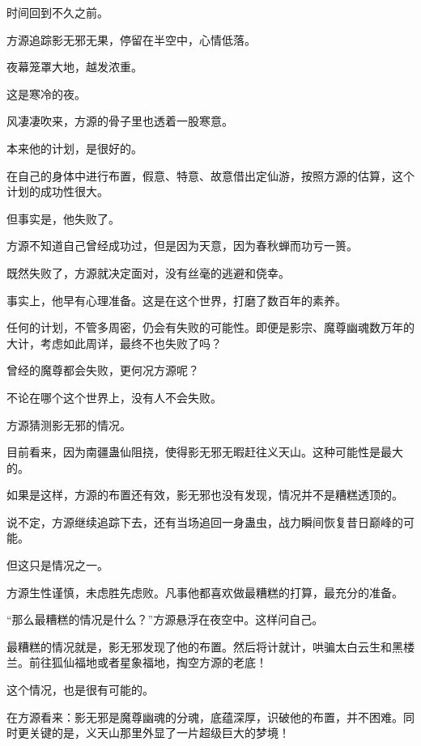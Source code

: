 
\begin{this_body}



时间回到不久之前。

方源追踪影无邪无果，停留在半空中，心情低落。

夜幕笼罩大地，越发浓重。

这是寒冷的夜。

风凄凄吹来，方源的骨子里也透着一股寒意。

本来他的计划，是很好的。

在自己的身体中进行布置，假意、特意、故意借出定仙游，按照方源的估算，这个计划的成功性很大。

但事实是，他失败了。

方源不知道自己曾经成功过，但是因为天意，因为春秋蝉而功亏一篑。

既然失败了，方源就决定面对，没有丝毫的逃避和侥幸。

事实上，他早有心理准备。这是在这个世界，打磨了数百年的素养。

任何的计划，不管多周密，仍会有失败的可能性。即便是影宗、魔尊幽魂数万年的大计，考虑如此周详，最终不也失败了吗？

曾经的魔尊都会失败，更何况方源呢？

不论在哪个这个世界上，没有人不会失败。

方源猜测影无邪的情况。

目前看来，因为南疆蛊仙阻挠，使得影无邪无暇赶往义天山。这种可能性是最大的。

如果是这样，方源的布置还有效，影无邪也没有发现，情况并不是糟糕透顶的。

说不定，方源继续追踪下去，还有当场追回一身蛊虫，战力瞬间恢复昔日巅峰的可能。

但这只是情况之一。

方源生性谨慎，未虑胜先虑败。凡事他都喜欢做最糟糕的打算，最充分的准备。

“那么最糟糕的情况是什么？”方源悬浮在夜空中。这样问自己。

最糟糕的情况就是，影无邪发现了他的布置。然后将计就计，哄骗太白云生和黑楼兰。前往狐仙福地或者星象福地，掏空方源的老底！

这个情况，也是很有可能的。

在方源看来：影无邪是魔尊幽魂的分魂，底蕴深厚，识破他的布置，并不困难。同时更关键的是，义天山那里外显了一片超级巨大的梦境！


\end{this_body}
